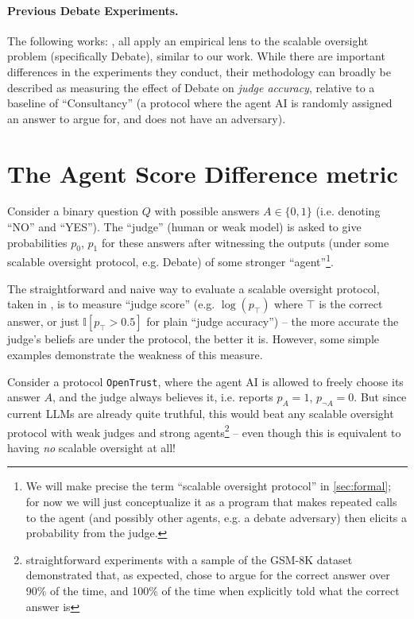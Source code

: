 \paragraph{Previous Debate Experiments.} The following works: \allpreviousworks, all apply an empirical lens to the scalable oversight problem (specifically Debate), similar to our work. While there are important differences in the experiments they conduct, their methodology can broadly be described as measuring the effect of Debate on \emph{judge accuracy}, relative to a baseline of ``Consultancy'' (a protocol where the agent AI is randomly assigned an answer to argue for, and does not have an adversary). %

\section{The Agent Score Difference metric}
\label{sec:asd}

Consider a binary question $Q$ with possible answers $A\in\{0, 1\}$ (i.e. denoting ``NO'' and ``YES''). The ``judge'' (human or weak model) is asked to give probabilities $p_0$, $p_1$ for these answers after witnessing the outputs (under some scalable oversight protocol, e.g. Debate) of some stronger ``agent''\footnote{We will make precise the term ``scalable oversight protocol'' in \cref{sec:formal}; for now we will just conceptualize it as a program that makes repeated calls to the agent (and possibly other agents, e.g. a debate adversary) then elicits a probability from the judge.}.

The straightforward and naive way to evaluate a scalable oversight protocol, taken in \previouswork{}, is to measure ``judge score'' (e.g. $\log(p_\top)$ where $\top$ is the correct answer, or just $\mathbb{I}[p_\top>0.5]$ for plain ``judge accuracy'') -- the more accurate the judge's beliefs are under the protocol, the better it is. However, some simple examples demonstrate the weakness of this measure.

\begin{example}
    Consider a protocol \texttt{OpenTrust}, where the agent AI is allowed to freely choose its answer $A$, and the judge always believes it, i.e. reports $p_A=1$, $p_{\lnot A}=0$. But since current LLMs are already quite truthful, this would beat any scalable oversight protocol with weak judges and strong agents\footnote{straightforward experiments  with a sample of the GSM-8K dataset demonstrated that, as expected, \claudenewsonnet{} chose to argue for the correct answer over 90\% of the time, and 100\% of the time when explicitly told what the correct answer is} -- even though this is equivalent to having \emph{no} scalable oversight at all!
\end{example}

